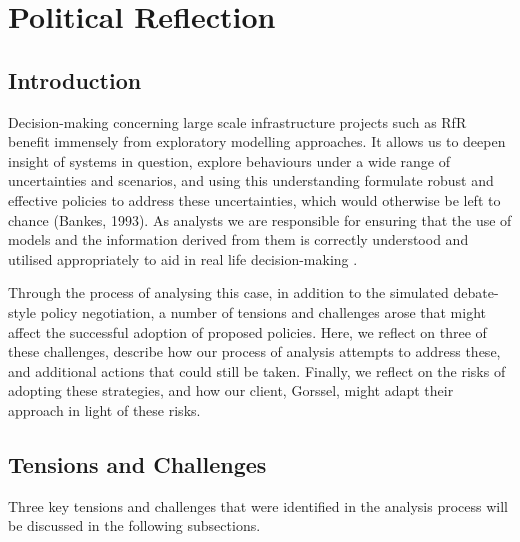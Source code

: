 \section{Political Reflection}
\label{s:poli_reflect}
\subsection{Introduction}

Decision-making concerning large scale infrastructure projects such as RfR benefit immensely from exploratory modelling approaches. It allows us to deepen insight of systems in question, explore behaviours under a wide range of uncertainties and scenarios, and using this understanding formulate robust and effective policies to address these uncertainties, which would otherwise be left to chance (Bankes, 1993). As analysts we are responsible for ensuring that the use of models and the information derived from them is correctly understood and utilised appropriately to aid in real life decision-making 
\parencite{pielke_honest_2007,van_enst_towards_2014}.

Through the process of analysing this case, in addition to the simulated debate-style policy negotiation, a number of tensions and challenges arose that might affect the successful adoption of proposed policies. Here, we reflect on three of these challenges, describe how our process of analysis attempts to address these, and additional actions that could still be taken. Finally, we reflect on the risks of adopting these strategies, and how our client, Gorssel, might adapt their approach in light of these risks.

\subsection{Tensions and Challenges} 

Three key tensions and challenges that were identified in the analysis process will be discussed in the following subsections. 

